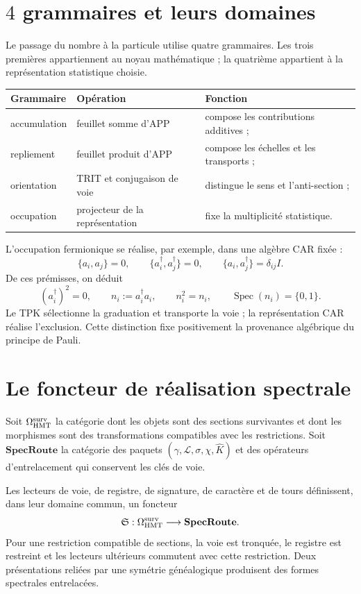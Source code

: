 \section{\(4\) grammaires et leurs domaines}

Le passage du nombre à la particule utilise quatre grammaires. Les
trois premières appartiennent au noyau mathématique ; la quatrième appartient à la
représentation statistique choisie.

\begin{center}
\begin{tabular}{@{}lll@{}}
\toprule
\textbf{Grammaire} & \textbf{Opération} & \textbf{Fonction}\\
\midrule
accumulation & feuillet somme d'APP & compose les contributions additives ;\\
repliement & feuillet produit d'APP & compose les échelles et les transports ;\\
orientation & TRIT et conjugaison de voie & distingue le sens et l'anti-section ;\\
occupation & projecteur de la représentation & fixe la multiplicité statistique.\\
\bottomrule
\end{tabular}
\end{center}

L'occupation fermionique se réalise, par exemple, dans une algèbre CAR fixée :
\[
 \{a_i,a_j\}=0,
 \qquad
 \{a_i^\dagger,a_j^\dagger\}=0,
 \qquad
 \{a_i,a_j^\dagger\}=\delta_{ij}I.
\]
De ces prémisses, on déduit
\[
 (a_i^\dagger)^2=0,
 \qquad
 n_i:=a_i^\dagger a_i,
 \qquad
 n_i^2=n_i,
 \qquad
 \operatorname{Spec}(n_i)=\{0,1\}.
\]
Le TPK sélectionne la graduation et transporte la voie ; la représentation CAR
réalise l'exclusion. Cette distinction fixe positivement la provenance
algébrique du principe de Pauli.

\section{Le foncteur de réalisation spectrale}

Soit \(\Omega_{\rm HMT}^{\rm surv}\) la catégorie dont les objets sont des sections
survivantes et dont les morphismes sont des transformations compatibles avec les
restrictions. Soit \(\mathbf{SpecRoute}\) la catégorie des paquets
\((\gamma,\mathcal L,\sigma,\chi,\widehat K)\) et des opérateurs d'entrelacement qui
conservent les clés de voie.

\begin{theorem}
\label{thm:functor-realizacion-espectral-numero}
Les lecteurs de voie, de registre, de signature, de caractère et de tours définissent, dans leur
domaine commun, un foncteur
\[
 \mathfrak S:
 \Omega_{\rm HMT}^{\rm surv}\longrightarrow\mathbf{SpecRoute}.
\]
Pour une restriction compatible de sections, la voie est tronquée, le registre
est restreint et les lecteurs ultérieurs commutent avec cette restriction. Deux
présentations reliées par une symétrie généalogique produisent des formes
spectrales entrelacées.
\end{theorem}

